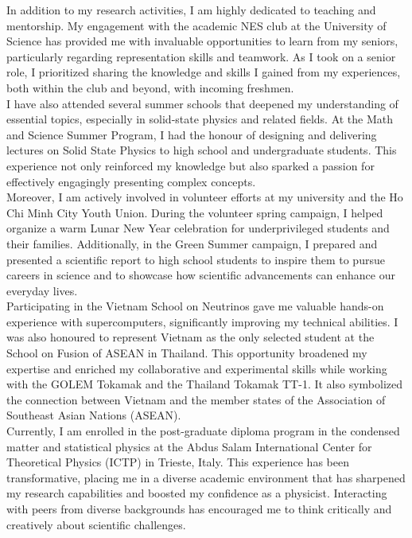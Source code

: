 \documentclass[a4paper]{article}
\begin{document}
In addition to my research activities, I am highly dedicated to teaching and mentorship. My engagement with the academic NES club at the University of Science has provided me with invaluable opportunities to learn from my seniors, particularly regarding representation skills and teamwork. As I took on a senior role, I prioritized sharing the knowledge and skills I gained from my experiences, both within the club and beyond, with incoming freshmen.\\\null\quad
I have also attended several summer schools that deepened my understanding of essential topics, especially in solid-state physics and related fields. At the Math and Science Summer Program, I had the honour of designing and delivering lectures on Solid State Physics to high school and undergraduate students. This experience not only reinforced my knowledge but also sparked a passion for effectively engagingly presenting complex concepts.\\\null\quad
Moreover, I am actively involved in volunteer efforts at my university and the Ho Chi Minh City Youth Union. During the volunteer spring campaign, I helped organize a warm Lunar New Year celebration for underprivileged students and their families. Additionally, in the Green Summer campaign, I prepared and presented a scientific report to high school students to inspire them to pursue careers in science and to showcase how scientific advancements can enhance our everyday lives.\\\null\quad
Participating in the Vietnam School on Neutrinos gave me valuable hands-on experience with supercomputers, significantly improving my technical abilities. I was also honoured to represent Vietnam as the only selected student at the School on Fusion of ASEAN in Thailand. This opportunity broadened my expertise and enriched my collaborative and experimental skills while working with the GOLEM Tokamak and the Thailand Tokamak TT-1. It also symbolized the connection between Vietnam and the member states of the Association of Southeast Asian Nations (ASEAN).\\\null\quad
Currently, I am enrolled in the post-graduate diploma program in the condensed matter and statistical physics at the Abdus Salam International Center for Theoretical Physics (ICTP) in Trieste, Italy. This experience has been transformative, placing me in a diverse academic environment that has sharpened my research capabilities and boosted my confidence as a physicist. Interacting with peers from diverse backgrounds has encouraged me to think critically and creatively about scientific challenges.\\\null\quad
\end{document}
